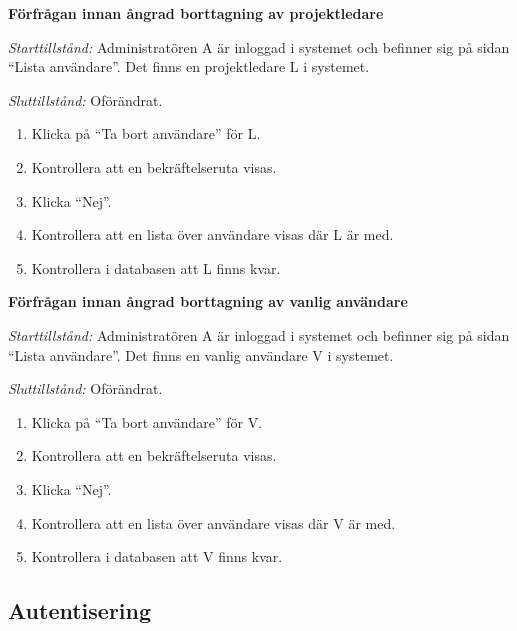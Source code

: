 \documentclass[a4paper]{article}
\begin{document}
\begin{FT}
\item \textbf{Förfrågan innan ångrad borttagning av projektledare}

\emph{Starttillstånd:} Administratören A är inloggad i systemet och befinner sig på sidan ``Lista användare''. Det finns en projektledare L i systemet.

\emph{Sluttillstånd:} Oförändrat.

\begin{enumerate}
\item Klicka på ``Ta bort användare'' för L.
\item Kontrollera att en bekräftelseruta visas.
\item Klicka ``Nej''.
\item Kontrollera att en lista över användare visas där L är med.
\item Kontrollera i databasen att L finns kvar.
\end{enumerate}

\item \textbf{Förfrågan innan ångrad borttagning av vanlig användare}

\emph{Starttillstånd:} Administratören A är inloggad i systemet och befinner sig på sidan ``Lista användare''. Det finns en vanlig användare V i systemet.

\emph{Sluttillstånd:} Oförändrat.

\begin{enumerate}
\item Klicka på ``Ta bort användare'' för V.
\item Kontrollera att en bekräftelseruta visas.
\item Klicka ``Nej''.
\item Kontrollera att en lista över användare visas där V är med.
\item Kontrollera i databasen att V finns kvar.
\end{enumerate}
\end{FT}




\subsection{Autentisering}
\end{document}
